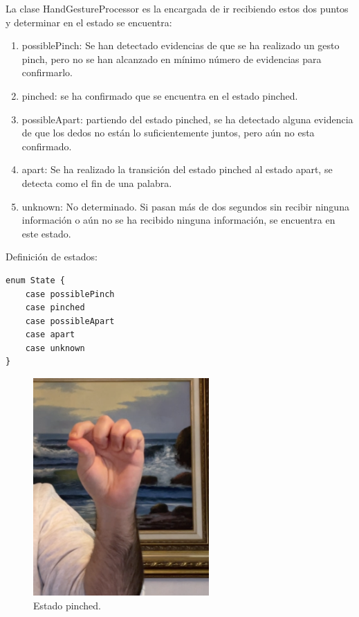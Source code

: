 \documentclass[../main.tex]{subfiles}
\begin{document}
La clase HandGestureProcessor es la encargada de ir recibiendo estos dos puntos y determinar en el estado se encuentra:
\begin{enumerate}
    \item possiblePinch: Se han detectado evidencias de que se ha realizado un gesto pinch, pero no se han alcanzado en mínimo número de evidencias para confirmarlo.
    \item pinched: se ha confirmado que se encuentra en el estado pinched. 
    \item possibleApart: partiendo del estado pinched, se ha detectado alguna evidencia de que los dedos no están lo suficientemente juntos, pero aún no esta confirmado.
    \item apart: Se ha realizado la transición del estado pinched al estado apart, se detecta como el fin de una palabra.
    \item unknown: No determinado. Si pasan más de dos segundos sin recibir ninguna información o aún no se ha recibido ninguna información, se encuentra en este estado. 
\end{enumerate}

Definición de estados:

\begin{lstlisting}[style=swift]
enum State {
    case possiblePinch
    case pinched
    case possibleApart
    case apart
    case unknown
}
\end{lstlisting}

\begin{figure}[h]
\centering 
\includegraphics[width=0.6\textwidth]{images/interpreter/pinch.png}
\caption{Estado pinched.}
\label{figure26}
\end{figure}
\end{document}
